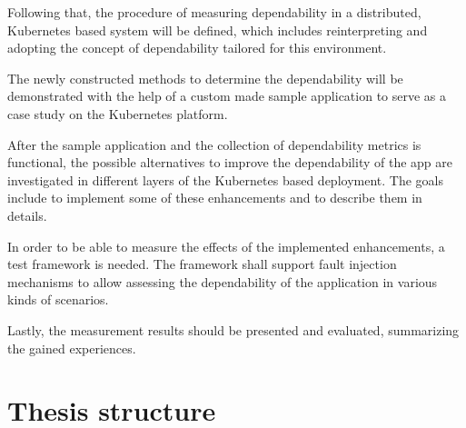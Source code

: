 Following that, the procedure of measuring dependability in a distributed, Kubernetes based system will be defined, which includes reinterpreting and adopting the concept of dependability tailored for this environment.

The newly constructed methods to determine the dependability will be demonstrated with the help of a custom made sample application to serve as a case study on the Kubernetes platform.

After the sample application and the collection of dependability metrics is functional, the possible alternatives to improve the dependability of the app are investigated in different layers of the Kubernetes based deployment. The goals include to implement some of these enhancements and to describe them in details.

In order to be able to measure the effects of the implemented enhancements, a test framework is needed. The framework shall support fault injection mechanisms to allow assessing the dependability of the application in various kinds of scenarios.

Lastly, the measurement results should be presented and evaluated, summarizing the gained experiences.



\section{Thesis structure}

